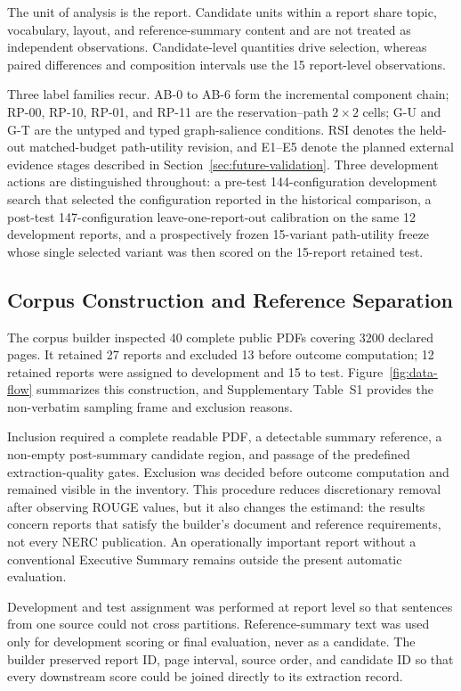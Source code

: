 \documentclass[information,article,submit,moreauthors]{Definitions/mdpi}
\begin{document}
The unit of analysis is the report. Candidate units within a report share topic, vocabulary, layout, and reference-summary content and are not treated as independent observations. Candidate-level quantities drive selection, whereas paired differences and composition intervals use the 15 report-level observations.

Three label families recur. AB-0 to AB-6 form the incremental component chain; RP-00, RP-10, RP-01, and RP-11 are the reservation--path $2\times2$ cells; G-U and G-T are the untyped and typed graph-salience conditions. RSI denotes the held-out matched-budget path-utility revision, and E1--E5 denote the planned external evidence stages described in Section~\ref{sec:future-validation}. Three development actions are distinguished throughout: a pre-test 144-configuration development search that selected the configuration reported in the historical comparison, a post-test 147-configuration leave-one-report-out calibration on the same 12 development reports, and a prospectively frozen 15-variant path-utility freeze whose single selected variant was then scored on the 15-report retained test.

\subsection{Corpus Construction and Reference Separation}

The corpus builder inspected 40 complete public PDFs covering 3200 declared pages. It retained 27 reports and excluded 13 before outcome computation; 12 retained reports were assigned to development and 15 to test. Figure~\ref{fig:data-flow} summarizes this construction, and Supplementary Table~S1 provides the non-verbatim sampling frame and exclusion reasons.

Inclusion required a complete readable PDF, a detectable summary reference, a non-empty post-summary candidate region, and passage of the predefined extraction-quality gates. Exclusion was decided before outcome computation and remained visible in the inventory. This procedure reduces discretionary removal after observing ROUGE values, but it also changes the estimand: the results concern reports that satisfy the builder's document and reference requirements, not every NERC publication. An operationally important report without a conventional Executive Summary remains outside the present automatic evaluation.

Development and test assignment was performed at report level so that sentences from one source could not cross partitions. Reference-summary text was used only for development scoring or final evaluation, never as a candidate. The builder preserved report ID, page interval, source order, and candidate ID so that every downstream score could be joined directly to its extraction record.
\end{document}
